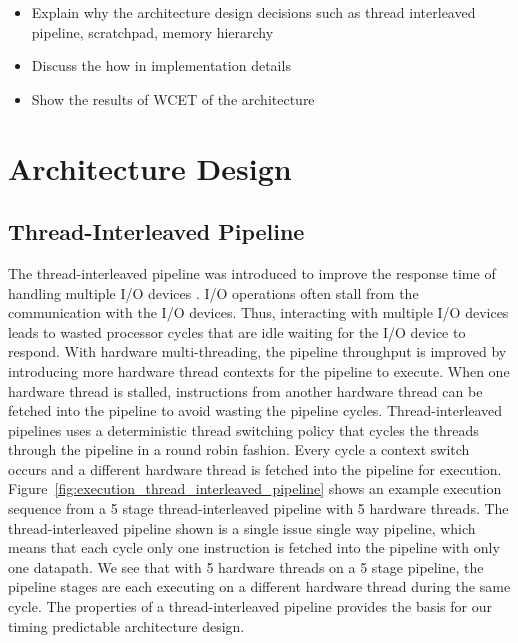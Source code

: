 \begin{itemize}
  \item Explain why the architecture design decisions such as thread interleaved pipeline, scratchpad, memory hierarchy
  \item Discuss the how in implementation details 
  \item Show the results of WCET of the architecture
\end{itemize}

\section{Architecture Design} 

\subsection{Thread-Interleaved Pipeline}
\label{subsection:pret_thread_pipeline}
The thread-interleaved pipeline was introduced to improve the response time of handling multiple I/O devices .
I/O operations often stall from the communication with the I/O devices.
Thus, interacting with multiple I/O devices leads to wasted processor cycles that are idle waiting for the I/O device to respond.
With hardware multi-threading, the pipeline throughput is improved by introducing more hardware thread contexts for the pipeline to execute. 
When one hardware thread is stalled, instructions from another hardware thread can be fetched into the pipeline to avoid wasting the pipeline cycles. 
Thread-interleaved pipelines uses a deterministic thread switching policy that cycles the threads through the pipeline in a round robin fashion.
Every cycle a context switch occurs and a different hardware thread is fetched into the pipeline for execution. 
Figure~\ref{fig:execution_thread_interleaved_pipeline} shows an example execution sequence from a 5 stage thread-interleaved pipeline with 5 hardware threads.
The thread-interleaved pipeline shown is a single issue single way pipeline, which means that each cycle only one instruction is fetched into the pipeline with only one datapath.
We see that with 5 hardware threads on a 5 stage pipeline, the pipeline stages are each executing on a different hardware thread during the same cycle.
The properties of a thread-interleaved pipeline provides the basis for our timing predictable architecture design.

